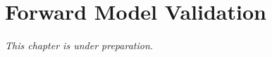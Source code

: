
\chapter{Forward Model Validation}
\label{ch:forward_validation}

\textit{This chapter is under preparation.}
